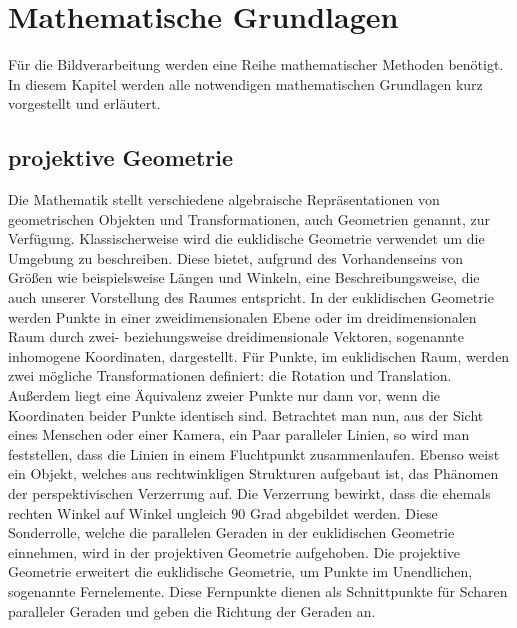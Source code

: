 \chapter{Mathematische Grundlagen}
F\"ur die Bildverarbeitung werden eine Reihe mathematischer Methoden ben\"otigt. In diesem Kapitel werden alle notwendigen mathematischen Grundlagen kurz vorgestellt und erl\"autert.

\section{projektive Geometrie}
Die Mathematik stellt verschiedene algebraische Repr\"asentationen von geometrischen Objekten und Transformationen, auch Geometrien genannt, zur Verf\"ugung.\cite{Schindler2015} Klassischerweise wird die euklidische Geometrie verwendet um die Umgebung zu beschreiben. Diese bietet, aufgrund des Vorhandenseins von Gr\"o{\ss}en wie beispielsweise L\"angen und Winkeln, eine Beschreibungsweise, die auch unserer Vorstellung des Raumes entspricht.
In der euklidischen Geometrie werden Punkte in einer zweidimensionalen Ebene oder im dreidimensionalen Raum durch zwei- beziehungsweise dreidimensionale Vektoren, sogenannte inhomogene Koordinaten, dargestellt. F\"ur Punkte, im euklidischen Raum, werden zwei m\"ogliche Transformationen definiert: die Rotation und Translation. Außerdem liegt eine \"Aquivalenz zweier Punkte nur dann vor, wenn die Koordinaten beider Punkte identisch sind.\cite{Rahmann2011} 
Betrachtet man nun, aus der Sicht eines Menschen oder einer Kamera, ein Paar paralleler Linien, so wird man feststellen, dass die Linien in einem Fluchtpunkt zusammenlaufen. Ebenso weist ein Objekt, welches aus rechtwinkligen Strukturen aufgebaut ist, das Ph\"anomen der perspektivischen Verzerrung auf. Die Verzerrung bewirkt, dass die ehemals rechten Winkel auf Winkel ungleich $90$ Grad abgebildet werden. Diese Sonderrolle, welche die parallelen Geraden in der euklidischen Geometrie einnehmen, wird in der projektiven Geometrie aufgehoben\cite{Wahner2011}. Die projektive Geometrie erweitert die euklidische Geometrie, um Punkte im Unendlichen, sogenannte Fernelemente. Diese Fernpunkte dienen als Schnittpunkte f\"ur Scharen paralleler Geraden und geben die Richtung der Geraden an. \cite{Wahner2011}

